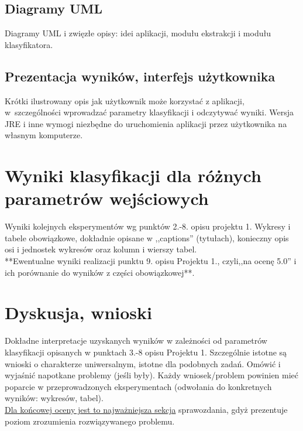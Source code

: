 \documentclass{classrep}
\begin{document}
\subsection{Diagramy UML}
Diagramy UML i zwięzłe opisy: idei aplikacji, modułu ekstrakcji i modułu
klasyfikatora.\\

\subsection{Prezentacja wyników, interfejs użytkownika} 
Krótki ilustrowany opis jak użytkownik może korzystać z aplikacji, w~szczególności wprowadzać parametry klasyfikacji i odczytywać wyniki. Wersja JRE i inne wymogi
niezbędne do uruchomienia aplikacji przez użytkownika na własnym komputerze. \\

\section{Wyniki klasyfikacji dla różnych parametrów wejściowych}
Wyniki kolejnych eksperymentów wg punktów 2.-8. opisu projektu 1.  Wykresy i tabele
obowiązkowe, dokładnie opisane w ,,captions'' (tytułach), konieczny opis osi i
jednostek wykresów oraz kolumn i wierszy tabel.\\ 

{**Ewentualne wyniki realizacji punktu 9. opisu Projektu 1., czyli,,na ocenę 5.0'' i ich porównanie do wyników z
części obowiązkowej**.}\\



\section{Dyskusja, wnioski}
Dokładne interpretacje uzyskanych wyników w zależności od parametrów klasyfikacji
opisanych w punktach 3.-8 opisu Projektu 1. 
Szczególnie istotne są wnioski o charakterze uniwersalnym, istotne dla podobnych zadań. 
Omówić i wyjaśnić napotkane problemy (jeśli były). Każdy wniosek/problem powinien mieć poparcie
w przeprowadzonych eksperymentach (odwołania do konkretnych wyników: wykresów,
tabel). \\
\underline{Dla końcowej oceny jest to najważniejsza sekcja} sprawozdania, gdyż prezentuje poziom
zrozumienia rozwiązywanego problemu.\\
\end{document}
